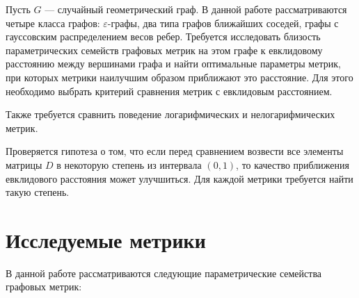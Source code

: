 Пусть $G$ --- случайный геометрический граф. В данной работе рассматриваются четыре класса графов: $\varepsilon$-графы, два типа графов ближайших соседей, графы с гауссовским распределением весов ребер. Требуется исследовать близость параметрических семейств графовых метрик на этом графе к евклидовому расстоянию между вершинами графа и найти оптимальные параметры метрик, при которых метрики наилучшим образом приближают это расстояние. Для этого необходимо выбрать критерий сравнения метрик с евклидовым расстоянием.

Также требуется сравнить поведение логарифмических и нелогарифмических метрик.

Проверяется гипотеза о том, что если перед сравнением возвести все элементы матрицы $D$ в некоторую степень из интервала $(0,1)$, то качество приближения евклидового расстояния может улучшиться. Для каждой метрики требуется найти такую степень.

\clearpage

\section{Исследуемые метрики} \label{sect1_3}

В данной работе рассматриваются следующие параметрические семейства графовых метрик:

